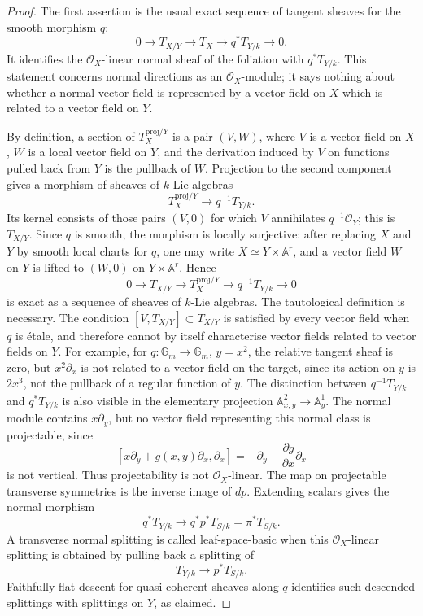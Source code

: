 \documentclass[11pt,reqno,a4paper,dvipsnames,x11names]{amsart}
\numberwithin{equation}{section}
\theoremstyle{plain}
\theoremstyle{definition}
\theoremstyle{remark}
\newcommand{\cO}{\mathcal{O}}
\newcommand{\kk}{k}
\newcommand{\from}{\colon}
\begin{document}
\begin{proof}
The first assertion is the usual exact sequence of tangent sheaves for the smooth morphism \(q\):
\[
 0\longrightarrow T_{X/Y}\longrightarrow T_X
 \longrightarrow q^*T_{Y/\kk}\longrightarrow 0.
\]
It identifies the \(\cO_X\)-linear normal sheaf of the foliation with \(q^*T_{Y/\kk}\). This statement concerns normal directions as an \(\cO_X\)-module; it says nothing about whether a normal vector field is represented by a vector field on \(X\) which is related to a vector field on \(Y\).

By definition, a section of \(T_X^{\mathrm{proj}/Y}\) is a pair \((V,W)\), where \(V\) is a vector field on \(X\), \(W\) is a local vector field on \(Y\), and the derivation induced by \(V\) on functions pulled back from \(Y\) is the pullback of \(W\). Projection to the second component gives a morphism of sheaves of \(\kk\)-Lie algebras
\[
 T_X^{\mathrm{proj}/Y}\longrightarrow q^{-1}T_{Y/\kk}.
\]
Its kernel consists of those pairs \((V,0)\) for which \(V\) annihilates \(q^{-1}\cO_Y\); this is \(T_{X/Y}\). Since \(q\) is smooth, the morphism is locally surjective: after replacing \(X\) and \(Y\) by smooth local charts for \(q\), one may write \(X\simeq Y\times\mathbb A^r\), and a vector field \(W\) on \(Y\) is lifted to \((W,0)\) on \(Y\times\mathbb A^r\). Hence
\[
 0\to T_{X/Y}\to T_X^{\mathrm{proj}/Y}\to q^{-1}T_{Y/\kk}\to0
\]
is exact as a sequence of sheaves of \(\kk\)-Lie algebras.
The tautological definition is necessary. The condition \([V,T_{X/Y}]\subset T_{X/Y}\) is satisfied by every vector field when \(q\) is \'{e}tale, and therefore cannot by itself characterise vector fields related to vector fields on \(Y\). For example, for \(q\from\mathbb G_m\to\mathbb G_m\), \(y=x^2\), the relative tangent sheaf is zero, but \(x^2\partial_x\) is not related to a vector field on the target, since its action on \(y\) is \(2x^3\), not the pullback of a regular function of \(y\).
The distinction between \(q^{-1}T_{Y/\kk}\) and \(q^*T_{Y/\kk}\) is also visible in the elementary projection \(\mathbb A^2_{x,y}\to\mathbb A^1_y\). The normal module contains \(x\partial_y\), but no vector field representing this normal class is projectable, since
\[
 [x\partial_y+g(x,y)\partial_x,\partial_x]
 =-\partial_y-\frac{\partial g}{\partial x}\partial_x
\]
is not vertical. Thus projectability is not \(\cO_X\)-linear.
The map on projectable transverse symmetries is the inverse image of \(dp\). Extending scalars gives the normal morphism
\[
 q^*T_{Y/\kk}\longrightarrow q^*p^*T_{S/\kk}=\pi^*T_{S/\kk}.
\]
A transverse normal splitting is called leaf-space-basic when this \(\cO_X\)-linear splitting is obtained by pulling back a splitting of
\[
 T_{Y/\kk}\longrightarrow p^*T_{S/\kk}.
\]
Faithfully flat descent for quasi-coherent sheaves along \(q\) identifies such descended splittings with splittings on \(Y\), as claimed.
\end{proof}
\end{document}
